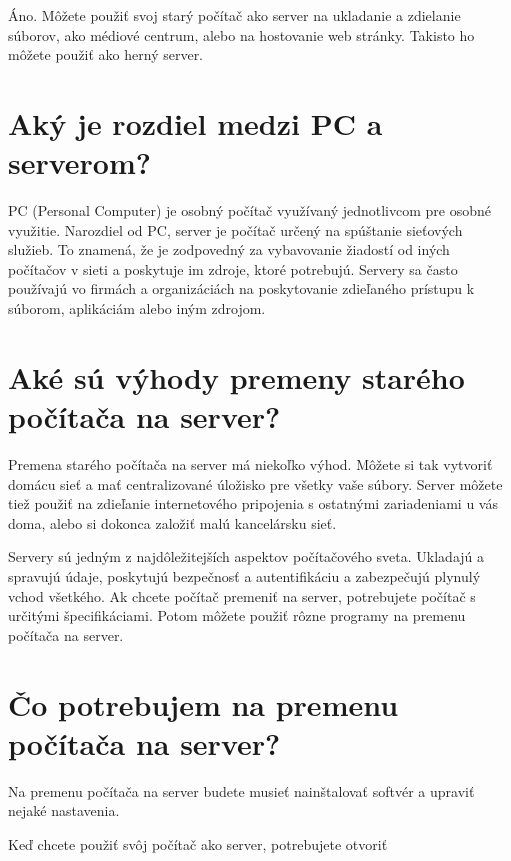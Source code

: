 Áno. Môžete použiť svoj starý počítač ako server na ukladanie a zdielanie súborov, ako médiové centrum, alebo na hostovanie web stránky. Takisto ho môžete použiť ako herný server.

\section*{Aký je rozdiel medzi PC a serverom?}

PC (Personal Computer) je osobný počítač využívaný jednotlivcom pre osobné využitie. Narozdiel od PC, server je počítač určený na spúštanie sieťových služieb. To znamená, že je zodpovedný za vybavovanie žiadostí od iných počítačov v sieti a poskytuje im zdroje, ktoré potrebujú. Servery sa často používajú vo firmách a organizáciách na poskytovanie zdieľaného prístupu k súborom, aplikáciám alebo iným zdrojom.

\section*{Aké sú výhody premeny starého počítača na server?}

Premena starého počítača na server má niekoľko výhod. Môžete si tak vytvoriť domácu sieť a mať centralizované úložisko pre všetky vaše súbory. Server môžete tiež použiť na zdieľanie internetového pripojenia s ostatnými zariadeniami u vás doma, alebo si dokonca založiť malú kancelársku sieť.

Servery sú jedným z najdôležitejších aspektov počítačového sveta. Ukladajú a spravujú údaje, poskytujú bezpečnosť a autentifikáciu a zabezpečujú plynulý vchod všetkého. Ak chcete počítač premeniť na server, potrebujete počítač s určitými špecifikáciami. Potom môžete použiť rôzne programy na premenu počítača na server.

\section{Čo potrebujem na premenu počítača na server?}

Na premenu počítača na server budete musieť nainštalovať softvér a upraviť nejaké nastavenia.

Keď chcete použiť svôj počítač ako server, potrebujete otvoriť 

